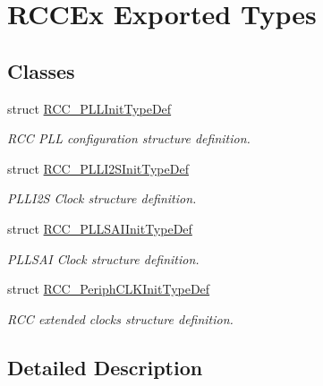 \hypertarget{group___r_c_c_ex___exported___types}{}\section{R\+C\+C\+Ex Exported Types}
\label{group___r_c_c_ex___exported___types}
\subsection*{Classes}
\begin{DoxyCompactItemize}
\item 
struct \mbox{\hyperlink{struct_r_c_c___p_l_l_init_type_def}{R\+C\+C\+\_\+\+P\+L\+L\+Init\+Type\+Def}}
\begin{DoxyCompactList}\small\item\em R\+CC P\+LL configuration structure definition. \end{DoxyCompactList}\item 
struct \mbox{\hyperlink{struct_r_c_c___p_l_l_i2_s_init_type_def}{R\+C\+C\+\_\+\+P\+L\+L\+I2\+S\+Init\+Type\+Def}}
\begin{DoxyCompactList}\small\item\em P\+L\+L\+I2S Clock structure definition. \end{DoxyCompactList}\item 
struct \mbox{\hyperlink{struct_r_c_c___p_l_l_s_a_i_init_type_def}{R\+C\+C\+\_\+\+P\+L\+L\+S\+A\+I\+Init\+Type\+Def}}
\begin{DoxyCompactList}\small\item\em P\+L\+L\+S\+AI Clock structure definition. \end{DoxyCompactList}\item 
struct \mbox{\hyperlink{struct_r_c_c___periph_c_l_k_init_type_def}{R\+C\+C\+\_\+\+Periph\+C\+L\+K\+Init\+Type\+Def}}
\begin{DoxyCompactList}\small\item\em R\+CC extended clocks structure definition. \end{DoxyCompactList}\end{DoxyCompactItemize}


\subsection{Detailed Description}
